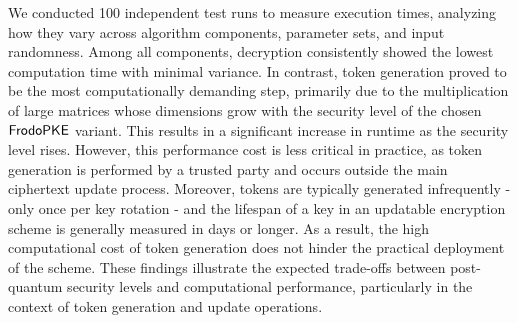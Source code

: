 \documentclass{fundam}
\begin{document}
We conducted 100 independent test runs to measure execution times, analyzing how they vary across algorithm components, parameter sets, and input randomness. Among all components, decryption consistently showed the lowest computation time with minimal variance. In contrast, token generation proved to be the most computationally demanding step, primarily due to the multiplication of large matrices whose dimensions grow with the security level of the chosen $\mathsf{FrodoPKE}$ variant. This results in a significant increase in runtime as the security level rises. However, this performance cost is less critical in practice, as token generation is performed by a trusted party and occurs outside the main ciphertext update process. Moreover, tokens are typically generated infrequently - only once per key rotation - and the lifespan of a key in an updatable encryption scheme is generally measured in days or longer. As a result, the high computational cost of token generation does not hinder the practical deployment of the scheme. These findings illustrate the expected trade-offs between post-quantum security levels and computational performance, particularly in the context of token generation and update operations.
\nocite{*}



\end{document}
